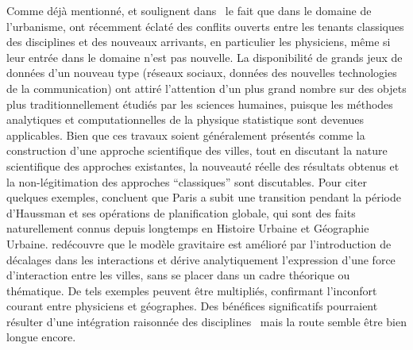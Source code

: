 {Comme déjà mentionné,  et  soulignent dans~\cite{dupuy2015sciences} le fait que dans le domaine de l'urbanisme, ont récemment éclaté des conflits ouverts entre les tenants classiques des disciplines et des nouveaux arrivants, en particulier les physiciens, même si leur entrée dans le domaine n'est pas nouvelle. La disponibilité de grands jeux de données d'un nouveau type (réseaux sociaux, données des nouvelles technologies de la communication) ont attiré l'attention d'un plus grand nombre sur des objets plus traditionnellement étudiés par les sciences humaines, puisque les méthodes analytiques et computationnelles de la physique statistique sont devenues applicables. Bien que ces travaux soient généralement présentés comme la construction d'une approche scientifique des villes, tout en discutant la nature scientifique des approches existantes, la nouveauté réelle des résultats obtenus et la non-légitimation des approches ``classiques'' sont discutables. Pour citer quelques exemples, \cite{barthelemy2013self} concluent que Paris a subit une transition pendant la période d'Haussman et ses opérations de planification globale, qui sont des faits naturellement connus depuis longtemps en Histoire Urbaine et Géographie Urbaine. \cite{chen2009urban} redécouvre que le modèle gravitaire est amélioré par l'introduction de décalages dans les interactions et dérive analytiquement l'expression d'une force d'interaction entre les villes, sans se placer dans un cadre théorique ou thématique. De tels exemples peuvent être multipliés, confirmant l'inconfort courant entre physiciens et géographes. Des bénéfices significatifs pourraient résulter d'une intégration raisonnée des disciplines~\cite{o2015physicists} mais la route semble être bien longue encore.
}




